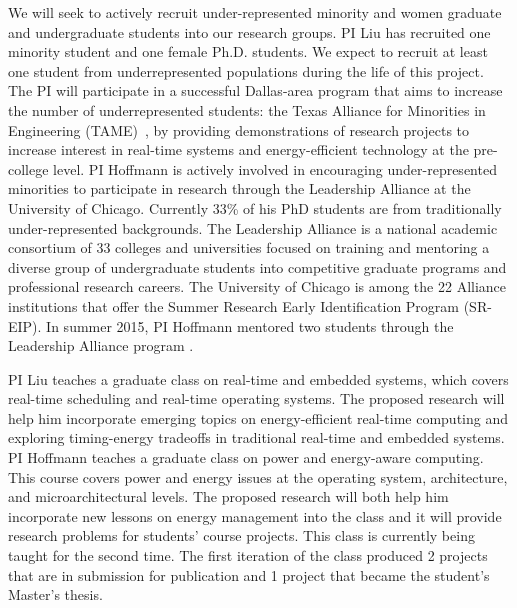 We will seek to actively recruit under-represented minority and women
graduate and undergraduate students into our research groups. PI Liu 
has  recruited one minority student and one female Ph.D. students. We expect to recruit at least one student from underrepresented populations during the life of this project. The PI will participate in a successful Dallas-area program that aims to increase the number of underrepresented students: the Texas Alliance for Minorities in Engineering (TAME)~\cite{TAME}, by providing demonstrations of research projects to increase interest in real-time systems and energy-efficient technology at the pre-college level. 
  PI Hoffmann is actively involved in encouraging under-represented
minorities to participate in research through the Leadership Alliance
at the University of Chicago.  Currently 33\% of his PhD students are
from traditionally under-represented backgrounds.  The Leadership
Alliance is a national academic consortium of 33 colleges and
universities focused on training and mentoring a diverse group of
undergraduate students into competitive graduate programs and
professional research careers.  The University of Chicago is among the
22 Alliance institutions that offer the Summer Research Early
Identification Program (SR-EIP). In summer 2015, PI Hoffmann mentored
two students through the Leadership Alliance program
\cite{LA-article}.


\vspace{0.1cm}
PI Liu teaches a graduate class on real-time and embedded systems, which covers real-time scheduling and real-time operating systems. The proposed research will help him incorporate emerging topics on energy-efficient real-time computing and exploring timing-energy tradeoffs in traditional real-time and embedded systems. 
PI Hoffmann teaches a graduate class on power and energy-aware
computing.  This course covers power and energy issues at the
operating system, architecture, and microarchitectural levels. The
proposed research will both help him incorporate new lessons on energy
management into the class and it will provide research problems for
students' course projects.  This class is currently being taught for
the second time. The first iteration of the class produced 2 projects
that are in submission for publication and 1 project that became the
student's Master's thesis.
